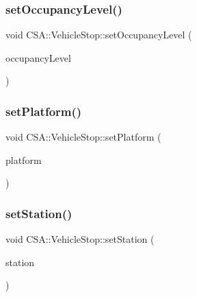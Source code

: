 \subsubsection{\texorpdfstring{set\+Occupancy\+Level()}{setOccupancyLevel()}}
{\footnotesize\ttfamily void C\+S\+A\+::\+Vehicle\+Stop\+::set\+Occupancy\+Level (\begin{DoxyParamCaption}\item[{const \mbox{\hyperlink{classCSA_1_1Vehicle_a331cc81107e5f0a8f37f894729dd9bda}{C\+S\+A\+::\+Vehicle\+::\+Occupancy\+Level}} \&}]{occupancy\+Level }\end{DoxyParamCaption})}

\mbox{\label{classCSA_1_1VehicleStop_a8ef5b90a559539e2a7b46ceed701e06d}} 
\subsubsection{\texorpdfstring{set\+Platform()}{setPlatform()}}
{\footnotesize\ttfamily void C\+S\+A\+::\+Vehicle\+Stop\+::set\+Platform (\begin{DoxyParamCaption}\item[{const Q\+String \&}]{platform }\end{DoxyParamCaption})}

\mbox{\label{classCSA_1_1VehicleStop_ae4a990a9e2c462461cf6cdccb129466c}} 
\subsubsection{\texorpdfstring{set\+Station()}{setStation()}}
{\footnotesize\ttfamily void C\+S\+A\+::\+Vehicle\+Stop\+::set\+Station (\begin{DoxyParamCaption}\item[{\mbox{\hyperlink{classCSA_1_1Station}{C\+S\+A\+::\+Station}} $\ast$}]{station }\end{DoxyParamCaption})}

\mbox{\label{classCSA_1_1VehicleStop_a90bc20355abad4463180a923b3bc3055}} 
